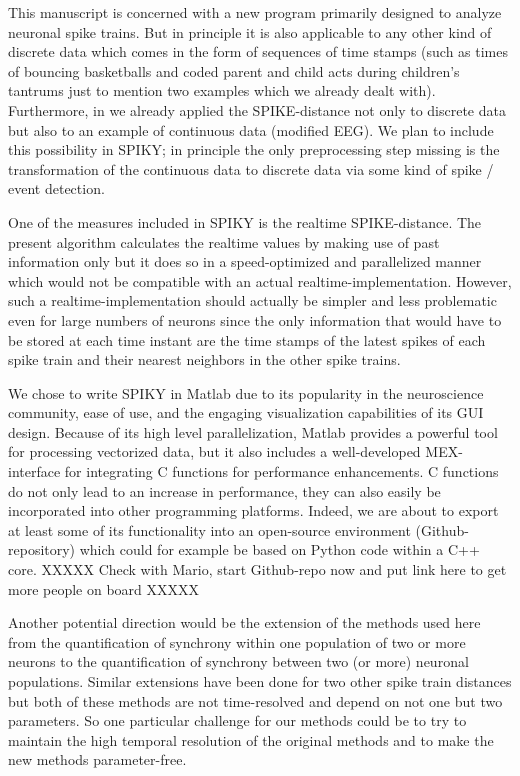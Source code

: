 \documentclass[10pt,twocolumn]{elsart5p}
\begin{document}
This manuscript is concerned with a new program primarily designed to analyze neuronal spike trains. But in principle it is also applicable to any other kind of discrete data which comes in the form of sequences of time stamps (such as times of bouncing basketballs and coded parent and child acts during children's tantrums just to mention two examples which we already dealt with). Furthermore, in \citet{Kreuz13} we already applied the SPIKE-distance not only to discrete data but also to an example of continuous data (modified EEG). We plan to include this possibility in SPIKY; in principle the only preprocessing step missing is the transformation of the continuous data to discrete data via some kind of spike / event detection.

One of the measures included in SPIKY is the realtime SPIKE-distance. The present algorithm calculates the realtime values by making use of past information only but it does so in a speed-optimized and parallelized manner which would not be compatible with an actual realtime-implementation. However, such a realtime-implementation should actually be simpler and less problematic even for large numbers of neurons since the only information that would have to be stored at each time instant are the time stamps of the latest spikes of each spike train and their nearest neighbors in the other spike trains.

We chose to write SPIKY in Matlab due to its popularity in the neuroscience community, ease of use, and the engaging visualization capabilities of its GUI design. Because of its high level parallelization, Matlab provides a powerful tool for processing vectorized data, but it also includes a well-developed MEX-interface for integrating C functions for performance enhancements. C functions do not only lead to an increase in performance, they can also easily be incorporated into other programming platforms. Indeed, we are about to export at least some of its functionality into an open-source environment (Github-repository) which could for example be based on Python code within a C++ core. XXXXX Check with Mario, start Github-repo now and put link here to get more people on board XXXXX

Another potential direction would be the extension of the methods used here from the quantification of synchrony within one population of two or more neurons to the quantification of synchrony between two (or more) neuronal populations. Similar extensions have been done for two other spike train distances \citep{Aronov03, Houghton08} but both of these methods are not time-resolved and depend on not one but two parameters. So one particular challenge for our methods could be to try to maintain the high temporal resolution of the original methods and to make the new methods parameter-free.
\end{document}
